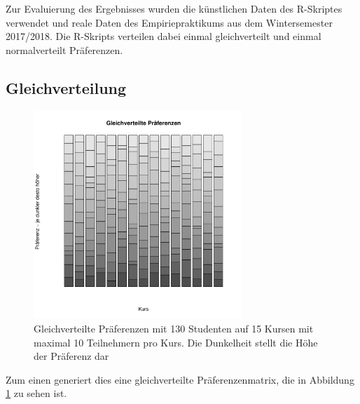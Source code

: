 		Zur Evaluierung des Ergebnisses wurden die künstlichen Daten des R-Skriptes verwendet und reale Daten des Empiriepraktikums aus dem Wintersemester 2017/2018.
		Die R-Skripts verteilen dabei einmal gleichverteilt und einmal normalverteilt Präferenzen.
		
		\subsection{Gleichverteilung}
	
			\begin{figure}
				\centering
				\includegraphics[width=0.7\textwidth]{./testing/images/EqualDistPreferencesDist.jpg}
				\caption{Gleichverteilte Präferenzen mit 130 Studenten auf 15 Kursen mit maximal 10 Teilnehmern pro Kurs. Die Dunkelheit stellt die Höhe der Präferenz dar}
				\label{fig:test_equal_distribution}
			\end{figure}
			Zum einen generiert dies eine gleichverteilte Präferenzenmatrix, die in Abbildung \ref{fig:test_equal_distribution} zu sehen ist.
			
